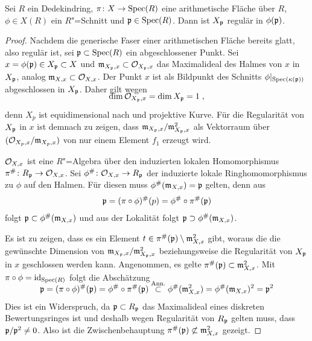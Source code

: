 \begin{Lemma}\label{thm:arithflschnittbilderglatt}
  Sei $R$ ein Dedekindring,
  $\pi\colon X\to\operatorname{Spec}(R)$ eine arithmetische Fläche über $R$,
  ${\phi\in X(R)}$ ein $R$"=Schnitt und $\mathfrak{p}\in\operatorname{Spec}(R)$.
  Dann ist $X_{\mathfrak{p}}$ regulär in $\phi(\mathfrak{p})$.
  \begin{proof}
    Nachdem die generische Faser einer arithmetischen Fläche bereits
    glatt, also regulär ist, sei $\mathfrak{p}\subset\operatorname{Spec}(R)$ ein abgeschlossener
    Punkt.
    Sei $x=\phi(\mathfrak{p})\in X_{\mathfrak{p}}\subset X$ und
    ${\mathfrak{m}_{X_{\mathfrak{p}},x}\subset\mathcal{O}_{X_{\mathfrak{p}},x}}$ das Maximalideal des Halmes von
    $x$ in $X_{\mathfrak{p}}$, analog ${\mathfrak{m}_{X,x}\subset\mathcal{O}_{X,x}}$.
    Der Punkt $x$ ist als Bildpunkt des Schnitts
    $\phi|_{\operatorname{Spec}(\kappa(\mathfrak{p}))}$ abgeschlossen in $X_{\mathfrak{p}}$.
    Daher gilt wegen \cite[Corollary~2.5.24]{liu}
    \begin{gather*}
      \SwapAboveDisplaySkip
      \dim\O_{X_\p,x}=\dim X_\p=1\;,
    \end{gather*}
    denn $X_p$ ist equidimensional nach
    \cite[Proposition~4.4.16]{liu} und projektive Kurve.
    Für die Regularität von $X_{\mathfrak{p}}$ in $x$ ist demnach zu zeigen,
    dass $\mathfrak{m}_{X_{\mathfrak{p}},x}/\mathfrak{m}_{X_{\mathfrak{p}},x}^2$ als Vektorraum über
    $(\mathcal{O}_{X_p,x}/\mathfrak{m}_{X_p,x})$ von nur einem Element $f_1$ erzeugt
    wird.
    
    $\mathcal{O}_{X,x}$ ist eine $R$"=Algebra über den induzierten lokalen
    Homomorphismus ${\pi^\#\colon R_{\mathfrak{p}}\to\mathcal{O}_{X,x}}$.
    Sei ${\phi^\#\colon\mathcal{O}_{X,x}\to R_{\mathfrak{p}}}$ der induzierte lokale
    Ringhomomorphismus zu $\phi$ auf den Halmen. Für diesen muss
    ${\phi^\#(\mathfrak{m}_{X,x})=\mathfrak{p}}$ gelten, denn aus
    \begin{gather*}
      {\ensuremath{\mathfrak{p}}=(\pi\circ\phi)^\#(p)=\phi^\#\circ\pi^\#(\ensuremath{\mathfrak{p}})}
    \end{gather*}
    folgt ${\mathfrak{p}\subset\phi^\#(\mathfrak{m}_{X,x})}$ und aus der Lokalität folgt
    ${\mathfrak{p}\supset\phi^\#(\mathfrak{m}_{X,x})}$.
    
    Es ist zu zeigen, dass es ein Element
    ${t\in\pi^\#(\mathfrak{p})\setminus\mathfrak{m}_{X,x}^2}$ gibt, woraus die
    die gewünschte Dimension von ${\mathfrak{m}_{X_{\mathfrak{p}},x}/\mathfrak{m}_{X_{\mathfrak{p}},x}^2}$
    beziehungsweise die Regularität von $X_{\mathfrak{p}}$ in $x$ geschlossen
    werden kann.
    Angenommen, es gelte ${\pi^\#(\mathfrak{p})\subset\mathfrak{m}_{X,x}^2}$.
    Mit ${\pi\circ\phi=\mathrm{id}_{\operatorname{Spec}(R)}}$ folgt die Abschätzung
    \begin{gather*}
      \SwapAboveDisplaySkip
      \p = (\pi\circ\phi)^\#(\p)
      = \phi^\#\circ\pi^\#(\p)
      \overset{\text{Ann.}}{\subset} \phi^\#(\m_{X,x}^2)
      = \phi^\#(\m_{X,x})^2
      = \p^2
    \end{gather*}
    Dies ist ein Widerspruch, da ${\mathfrak{p}\subset R_{\mathfrak{p}}}$ das Maximalideal
    eines diskreten Bewertungsringes ist und deshalb wegen Regularität
    von $R_{\mathfrak{p}}$ gelten muss, dass ${\mathfrak{p}/\mathfrak{p}^2\neq 0}$.
    Also ist die Zwischenbehauptung
    ${\pi^\#(\mathfrak{p})\not\subset\mathfrak{m}_{X,x}^2}$ gezeigt.


\end{proof}
\end{Lemma}
